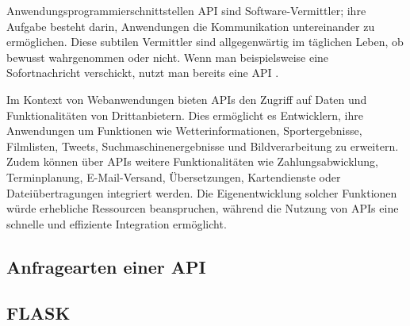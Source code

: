 Anwendungsprogrammierschnittstellen \ac{API} sind Software-Vermittler; ihre Aufgabe besteht darin, Anwendungen die Kommunikation untereinander zu ermöglichen. Diese subtilen Vermittler sind allgegenwärtig im täglichen Leben, ob bewusst wahrgenommen oder nicht. Wenn man beispielsweise eine Sofortnachricht verschickt, nutzt man bereits eine \ac{API} \cite{pykes_programmieren_nodate}.

Im Kontext von Webanwendungen bieten \ac{API}s den Zugriff auf Daten und Funktionalitäten von Drittanbietern. Dies ermöglicht es Entwicklern, ihre Anwendungen um Funktionen wie Wetterinformationen, Sportergebnisse, Filmlisten, Tweets, Suchmaschinenergebnisse und Bildverarbeitung zu erweitern. Zudem können über APIs weitere Funktionalitäten wie Zahlungsabwicklung, Terminplanung, E-Mail-Versand, Übersetzungen, Kartendienste oder Dateiübertragungen integriert werden. Die Eigenentwicklung solcher Funktionen würde erhebliche Ressourcen beanspruchen, während die Nutzung von APIs eine schnelle und effiziente Integration ermöglicht\cite{digital_ocean_llc_erste_nodate}.


\subsection{Anfragearten einer API} \label{subsec:anfragearten_einer_api}  %

\subsection{FLASK} \label{subsec:flask}  %